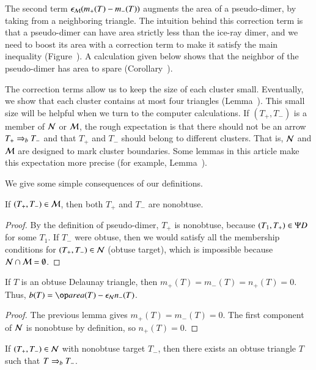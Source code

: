 The second term $\epsilon_{\mathcal M} (m_+(T) - m_-(T))$ augments the area of a
pseudo-dimer, by taking from a neighboring triangle.  The intuition
behind this correction term is that a pseudo-dimer can have area
strictly less than the ice-ray dimer, and we need to boost its area
with a correction term to make it satisfy the main inequality
(Figure~).  A calculation given below shows that
the neighbor of the pseudo-dimer has area to spare
(Corollary~).

The correction terms allow us to keep the size of each cluster small.
Eventually, we show that each cluster contains at most four triangles
(Lemma~).  This small size will be helpful when we
turn to the computer calculations.  If $(T_+,T_-)$ is a member of $\mathcal N$
or $\mathcal M$, the rough expectation is that there should not be an arrow
$T_+\Rightarrow_{b} T_-$ and that $T_+$ and $T_-$ should belong to different
clusters.  That is, $\mathcal N$ and $\mathcal M$ are designed to mark cluster
boundaries.  Some lemmas in this article make this expectation more
precise (for example, Lemma~).

We give some simple consequences of our definitions.

\begin{lemma} 
  If $(T_+,T_-)\in \mathcal M$, then both $T_+$ and $T_-$ are nonobtuse.
\end{lemma}

\begin{proof} 
  By the definition of pseudo-dimer, $T_+$ is nonobtuse, because
  $(T_1,T_+)\in\Psi D$ for some $T_1$.  If $T_-$ were obtuse, then we
  would satisfy all the membership conditions for $(T_+,T_-)\in \mathcal N$
  (obtuse target), which is impossible because $\mathcal N\cap \mathcal M =
  \emptyset$.
\end{proof}

\begin{lemma}[obtuse $b$] 
  If $T$ is an obtuse Delaunay triangle, then
  $m_+(T)=m_-(T)=n_+(T)=0$.  Thus, $b(T) = \area(T) - \epsN n_-(T)$.
\end{lemma}

\begin{proof} 
  The previous lemma gives $m_+(T)=m_-(T)=0$.  The first component of
  $\mathcal N$ is nonobtuse by definition, so $n_+(T)=0$.
\end{proof}

\begin{corollary} 
  If $(T_+,T_-)\in\mathcal N$ with nonobtuse target $T_-$, then there exists
  an obtuse triangle $T$ such that $T\Rightarrow_{b} T_-$.
\end{corollary}

